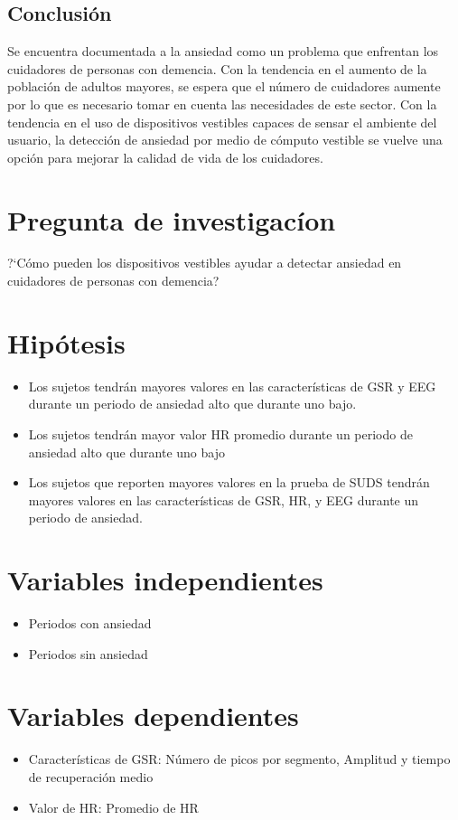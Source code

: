 \subsection{Conclusi\'on}
	Se encuentra documentada a la ansiedad como un problema que enfrentan los cuidadores de personas con demencia. Con la tendencia en el aumento de la poblaci\'on de adultos mayores, se espera que el n\'umero de cuidadores aumente por lo que es necesario tomar en cuenta las necesidades de este sector. Con la tendencia en el uso de dispositivos vestibles capaces de sensar el ambiente del usuario, la detecci\'on de ansiedad por medio de c\'omputo vestible se vuelve una opci\'on para mejorar la calidad de vida de los cuidadores.

\section{Pregunta de investigac\'ion}
	?`C\'omo pueden los dispositivos vestibles ayudar a detectar ansiedad en cuidadores de personas con demencia?
\section{Hip\'otesis}
	\begin{itemize}
	\item{Los sujetos tendr\'an mayores valores en las caracter\'isticas de GSR y EEG durante un periodo de ansiedad alto que durante uno bajo.}
	\item{Los sujetos tendr\'an mayor valor HR promedio durante un periodo de ansiedad alto que durante uno bajo}
	\item{Los sujetos que reporten mayores valores en la prueba de SUDS tendr\'an mayores valores en las caracter\'isticas de GSR, HR, y EEG durante un periodo de ansiedad.}
	\end{itemize}
\section{Variables independientes}
	\begin{itemize}
		\item{Periodos con ansiedad}
		\item{Periodos sin ansiedad}
	\end{itemize}
\section{Variables dependientes}
	\begin{itemize}
		\item{Caracter\'isticas de GSR: N\'umero de picos por segmento, Amplitud y tiempo de recuperaci\'on medio}
		\item{Valor de HR: Promedio de HR}
	\end{itemize}
